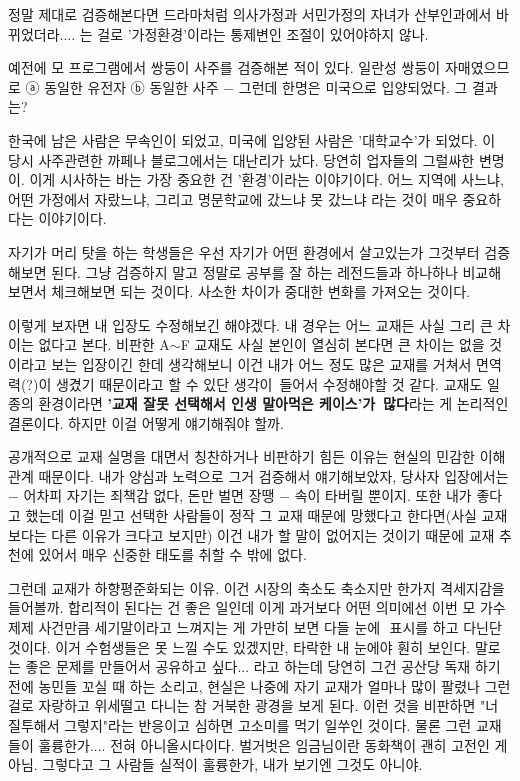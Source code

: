 정말 제대로 검증해본다면 드라마처럼 의사가정과 서민가정의 자녀가 산부인과에서 바뀌었더라.... 는 걸로
'가정환경'이라는 통제변인 조절이 있어야하지 않나.
\vspace{5mm}

예전에 모 프로그램에서 쌍둥이 사주를 검증해본 적이 있다.
일란성 쌍둥이 자매였으므로 ⓐ 동일한 유전자 ⓑ 동일한 사주 $-$ 그런데 한명은 미국으로 입양되었다.
그 결과는?
\vspace{5mm}

한국에 남은 사람은 무속인이 되었고, 미국에 입양된 사람은 '대학교수'가 되었다.
이 당시 사주관련한 까페나 블로그에서는 대난리가 났다. 당연히 업자들의 그럴싸한 변명이.
이게 시사하는 바는 가장 중요한 건 '환경'이라는 이야기이다.
어느 지역에 사느냐, 어떤 가정에서 자랐느냐, 그리고 명문학교에 갔느냐 못 갔느냐 라는 것이 매우 중요하다는 이야기이다.
\vspace{5mm}

자기가 머리 탓을 하는 학생들은 우선 자기가 어떤 환경에서 살고있는가 그것부터 검증해보면 된다.
그냥 검증하지 말고 정말로 공부를 잘 하는 레전드들과 하나하나 비교해보면서 체크해보면 되는 것이다.
사소한 차이가 중대한 변화를 가져오는 것이다.
\vspace{5mm}

이렇게 보자면 내 입장도 수정해보긴 해야겠다. 내 경우는 어느 교재든 사실 그리 큰 차이는 없다고 본다.
비판한 A$\sim$F 교재도 사실 본인이 열심히 본다면 큰 차이는 없을 것이라고 보는 입장이긴 한데
생각해보니 이건 내가 어느 정도 많은 교재를 거쳐서 면역력(?)이 생겼기 때문이라고 할 수 있단 생각이 들어서 수정해야할 것 같다.
교재도 일종의 환경이라면 \textbf{'교재 잘못 선택해서 인생 말아먹은 케이스'가 많다}라는 게 논리적인 결론이다.
하지만 이걸 어떻게 얘기해줘야 할까.
\vspace{5mm}

공개적으로 교재 실명을 대면서 칭찬하거나 비판하기 힘든 이유는 현실의 민감한 이해관계 때문이다.
내가 양심과 노력으로 그거 검증해서 얘기해보았자, 당사자 입장에서는 $-$ 어차피 자기는 죄책감 없다, 돈만 벌면 장땡 $-$ 속이 타버릴 뿐이지.
또한 내가 좋다고 했는데 이걸 믿고 선택한 사람들이 정작 그 교재 때문에 망했다고 한다면(사실 교재보다는 다른 이유가 크다고 보지만)
이건 내가 할 말이 없어지는 것이기 때문에 교재 추천에 있어서 매우 신중한 태도를 취할 수 밖에 없다.
\vspace{5mm}

그런데 교재가 하향평준화되는 이유. 이건 시장의 축소도 축소지만 한가지 격세지감을 들어볼까.
합리적이 된다는 건 좋은 일인데 이게 과거보다 어떤 의미에선 이번 모 가수 제제 사건만큼 세기말이라고 느껴지는 게
가만히 보면 다들 눈에 $ $ 표시를 하고 다닌단 것이다.
이거 수험생들은 못 느낄 수도 있겠지만, 타락한 내 눈에야 훤히 보인다.
말로는 좋은 문제를 만들어서 공유하고 싶다... 라고 하는데 당연히 그건 공산당 독재 하기 전에 농민들 꼬실 때 하는 소리고,
현실은 나중에 자기 교재가 얼마나 많이 팔렸나 그런 걸로 자랑하고 위세떨고 다니는 참 거북한 광경을 보게 된다.
이런 것을 비판하면 "너 질투해서 그렇지"라는 반응이고 심하면 고소미를 먹기 일쑤인 것이다.
물론 그런 교재들이 훌륭한가.... 전혀 아니올시다이다. 벌거벗은 임금님이란 동화책이 괜히 고전인 게 아님.
그렇다고 그 사람들 실적이 훌륭한가, 내가 보기엔 그것도 아니야.
\vspace{5mm}

